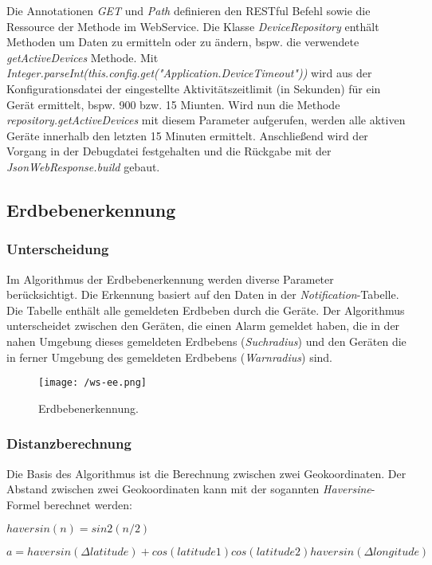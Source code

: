 Die Annotationen \textit{GET} und \textit{Path} definieren den RESTful Befehl sowie die Ressource der Methode im WebService. Die Klasse \textit{DeviceRepository} enthält Methoden um Daten zu ermitteln oder zu ändern, bspw. die verwendete \textit{getActiveDevices} Methode. Mit \textit{Integer.parseInt(this.config.get("Application.DeviceTimeout"))} wird aus der Konfigurationsdatei der eingestellte Aktivitätszeitlimit (in Sekunden) für ein Gerät ermittelt, bspw. 900 bzw. 15 Miunten. Wird nun die Methode \textit{repository.getActiveDevices} mit diesem Parameter aufgerufen, werden alle aktiven Geräte innerhalb den letzten 15 Minuten ermittelt. Anschließend wird der Vorgang in der Debugdatei festgehalten und die Rückgabe mit der \textit{JsonWebResponse.build} gebaut.

\subsection{Erdbebenerkennung}
\subsubsection{Unterscheidung}
Im Algorithmus der Erdbebenerkennung werden diverse Parameter berücksichtigt. Die Erkennung basiert auf den Daten in der \textit{Notification}-Tabelle. Die Tabelle enthält alle gemeldeten Erdbeben durch die Geräte. Der Algorithmus unterscheidet zwischen den Geräten, die einen Alarm gemeldet haben, die in der nahen Umgebung dieses gemeldeten Erdbebens (\textit{Suchradius}) und den Geräten die in ferner Umgebung des gemeldeten Erdbebens (\textit{Warnradius}) sind.
\medskip
\begin{figure}[H]
\centering
\texttt{[image: /ws-ee.png]}
\caption{Erdbebenerkennung.}
\label{fig:WSEE}
\end{figure}

\subsubsection{Distanzberechnung}
Die Basis des Algorithmus ist die Berechnung zwischen zwei Geokoordinaten. Der Abstand zwischen zwei Geokoordinaten kann mit der sogannten \textit{Haversine}-Formel berechnet werden:

\begin{math}haversin(n) = sin2(n/2)\end{math}

\begin{math}a = haversin(\Delta latitude) + cos(latitude1) cos(latitude2) haversin(\Delta longitude)\end{math}

